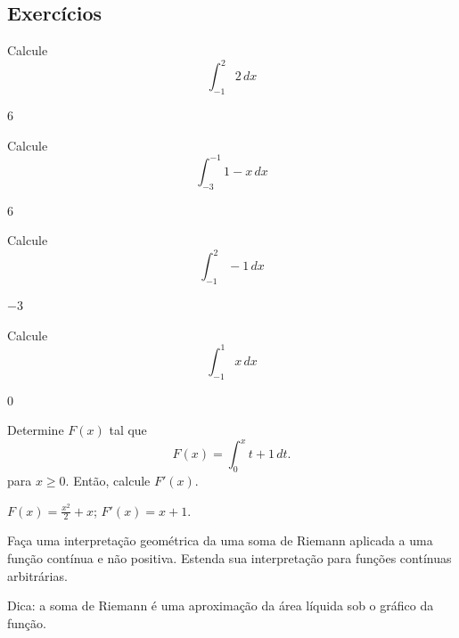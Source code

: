 \cleardoublepage\documentclass[../main.tex]{subfiles}
\begin{document}
\subsection{Exercícios}
\begin{multicols}{2}
\begin{exer}
  Calcule
  \begin{equation*}
    \int_{-1}^2 2\,dx
  \end{equation*}
\end{exer}
\begin{resp}
  $6$
\end{resp}

\begin{exer}
  Calcule
  \begin{equation*}
    \int_{-3}^{-1} 1-x\,dx
  \end{equation*}
\end{exer}
\begin{resp}
  $6$
\end{resp}


\begin{exer}
  Calcule
  \begin{equation*}
    \int_{-1}^2 -1\,dx
  \end{equation*}
\end{exer}
\begin{resp}
  $-3$
\end{resp}

\begin{exer}
  Calcule
  \begin{equation*}
    \int_{-1}^{1} x\,dx
  \end{equation*}
\end{exer}
\begin{resp}
  $0$
\end{resp}
\begin{exer}
  Determine $F(x)$ tal que
  \begin{equation*}
    F(x) = \int_{0}^{x} t+1\,dt.
  \end{equation*}
  para $x\geq 0$. Então, calcule $F'(x)$.
\end{exer}
\begin{resp}
  $\displaystyle F(x) = \frac{x^2}{2} + x$; $F'(x) = x + 1$.
\end{resp}
\end{multicols}
\begin{exer}\label{exer:int_geoRiemann}
  Faça uma interpretação geométrica da uma soma de Riemann aplicada a uma função contínua e não positiva. Estenda sua interpretação para funções contínuas arbitrárias.
\end{exer}
\begin{resp}
  Dica: a soma de Riemann é uma aproximação da área líquida sob o gráfico da função.
\end{resp}
\end{document}
